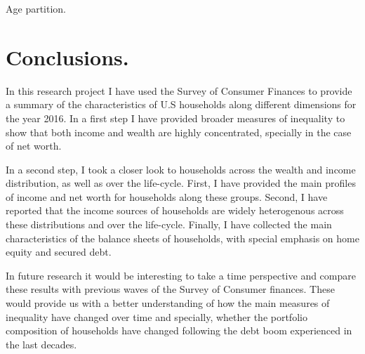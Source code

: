 \documentclass[11pt, a4paper, leqno]{article}
\begin{document}
\begin{table}
    \caption{Age partition.}
    \resizebox{\textwidth}{!}{}
    \label{tab:agepartition}
\end{table}


\section{Conclusions.}
 
 In this research project I have used the Survey of Consumer Finances to provide a summary of the characteristics of U.S households along different dimensions for the year 2016. In a first step I have provided broader measures of inequality to show that both income and wealth are highly concentrated, specially in the case of net worth. 

 In a second step, I took a closer look to households across the wealth and income distribution, as well as over the life-cycle. First, I have provided the main profiles of income and net worth for households along these groups. Second, I have reported that the income sources of households are widely heterogenous across these distributions and over the life-cycle. Finally, I have collected the main characteristics of the balance sheets of households, with special emphasis on home equity and secured debt.

 In future research it would be interesting to take a time perspective and compare these results with previous waves of the Survey of Consumer finances. These would provide us with a better understanding of how the main measures of inequality have changed over time and specially, whether the portfolio composition of households have changed following the debt boom experienced in the last decades. 










\end{document}
